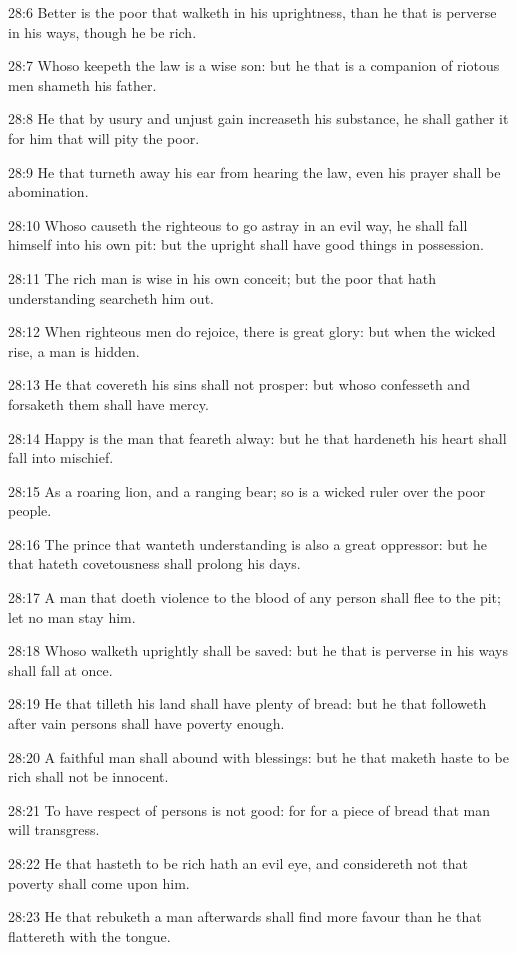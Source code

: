 28:6 Better is the poor that walketh in his uprightness, than he that is perverse in his ways, though he be rich.

28:7 Whoso keepeth the law is a wise son: but he that is a companion of riotous men shameth his father.

28:8 He that by usury and unjust gain increaseth his substance, he shall gather it for him that will pity the poor.

28:9 He that turneth away his ear from hearing the law, even his prayer shall be abomination.

28:10 Whoso causeth the righteous to go astray in an evil way, he shall fall himself into his own pit: but the upright shall have good things in possession.

28:11 The rich man is wise in his own conceit; but the poor that hath understanding searcheth him out.

28:12 When righteous men do rejoice, there is great glory: but when the wicked rise, a man is hidden.

28:13 He that covereth his sins shall not prosper: but whoso confesseth and forsaketh them shall have mercy.

28:14 Happy is the man that feareth alway: but he that hardeneth his heart shall fall into mischief.

28:15 As a roaring lion, and a ranging bear; so is a wicked ruler over the poor people.

28:16 The prince that wanteth understanding is also a great oppressor: but he that hateth covetousness shall prolong his days.

28:17 A man that doeth violence to the blood of any person shall flee to the pit; let no man stay him.

28:18 Whoso walketh uprightly shall be saved: but he that is perverse in his ways shall fall at once.

28:19 He that tilleth his land shall have plenty of bread: but he that followeth after vain persons shall have poverty enough.

28:20 A faithful man shall abound with blessings: but he that maketh haste to be rich shall not be innocent.

28:21 To have respect of persons is not good: for for a piece of bread that man will transgress.

28:22 He that hasteth to be rich hath an evil eye, and considereth not that poverty shall come upon him.

28:23 He that rebuketh a man afterwards shall find more favour than he that flattereth with the tongue.

